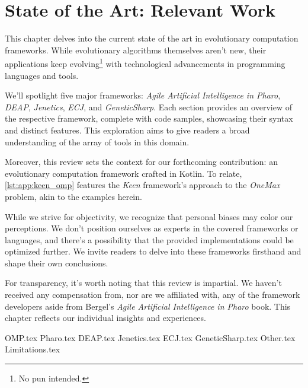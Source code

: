 \chapter{State of the Art: Relevant Work}
\label{chap:sota}
  This chapter delves into the current state of the art in evolutionary 
  computation frameworks.
  While evolutionary algorithms themselves aren't new, their applications keep 
  evolving\footnote{No pun intended.} with technological advancements in 
  programming languages and tools.

  We'll spotlight five major frameworks: \emph{Agile Artificial Intelligence in 
  Pharo}, \emph{DEAP}, \emph{Jenetics}, \emph{ECJ}, and \emph{GeneticSharp}.
  Each section provides an overview of the respective framework, complete with 
  code samples, showcasing their syntax and distinct features.
  This exploration aims to give readers a broad understanding of the array of 
  tools in this domain.

  Moreover, this review sets the context for our forthcoming contribution: an 
  evolutionary computation framework crafted in Kotlin.
  To relate, \vref{lst:app:keen_omp} features the \emph{Keen} framework's 
  approach to the \emph{OneMax} problem, akin to the examples herein.

  While we strive for objectivity, we recognize that personal biases may color 
  our perceptions.
  We don't position ourselves as experts in the covered frameworks or languages, 
  and there's a possibility that the provided implementations could be optimized 
  further.
  We invite readers to delve into these frameworks firsthand and shape their own 
  conclusions.

  For transparency, it's worth noting that this review is impartial.
  We haven't received any compensation from, nor are we affiliated with, any of 
  the framework developers aside from Bergel's \emph{Agile Artificial 
  Intelligence in Pharo} book.
  This chapter reflects our individual insights and experiences.

  {OMP.tex}
  {Pharo.tex}
  {DEAP.tex}
  {Jenetics.tex}
  {ECJ.tex}
  {GeneticSharp.tex}
  {Other.tex}
  {Limitations.tex}
